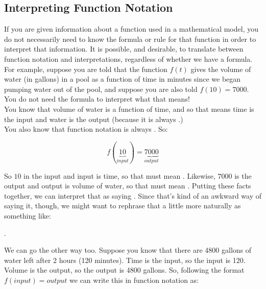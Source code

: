 \subsection{Interpreting Function Notation}

If you are given information about a function used in a mathematical model, you do not necessarily need to know the formula or rule for that function in order to interpret that information. It is possible, and desirable, to translate between function notation and interpretations, regardless of whether we have a formula.\\

For example, suppose you are told that the function $f(t)$ gives the volume of water (in gallons) in a pool as a function of time in minutes since we began pumping water out of the pool, and suppose you are also told $f(10)=7000$.  You do not need the formula to interpret what that means!\\

You know that volume of water is a function of time, and so that means time is the input and water is the output (because it is always .)\\

You also know that function notation is always . So:

\begin{equation*}
	f\left(\underbrace{10}_{input} \right)=\underbrace{7000}_{output}
\end{equation*}

So $10$ in the input and input is time, so that must mean . Likewise, $7000$ is the output and output is volume of water, so that must mean . Putting these facts together, we can interpret that as saying . Since that’s kind of an awkward way of saying it, though, we might want to rephrase that a little more naturally as something like:

\begin{center}
	.
\end{center}

We can go the other way too. Suppose you know that there are 4800 gallons of water left after 2 hours (120 minutes). Time is the input, so the input is 120. Volume is the output, so the output is 4800 gallons. So, following the format $f(input)=output$ we can write this in function notation as:

